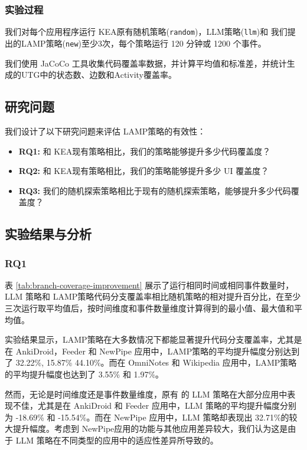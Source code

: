 \documentclass[twocolumn, 10pt]{article}
\newcommand{\kea}{K{\small\MakeUppercase{ea}}}
\newcommand{\lamp}{L{\small\MakeUppercase{amp}}}
\begin{document}
\subsubsection{实验过程}

我们对每个应用程序运行 \kea 原有随机策略(\texttt{random})，LLM策略(\texttt{llm})和 我们提出的\lamp 策略(\texttt{new})至少3次，每个策略运行 120 分钟或 1200 个事件。

我们使用 JaCoCo 工具收集代码覆盖率数据，并计算平均值和标准差，并统计生成的UTG中的状态数、边数和Activity覆盖率。

\subsection{研究问题}

我们设计了以下研究问题来评估 \lamp 策略的有效性：

\begin{itemize}[noitemsep]
    \item \textbf{RQ1:} 和 \kea 现有策略相比，我们的策略能够提升多少代码覆盖度？
    \item \textbf{RQ2:} 和 \kea 现有策略相比，我们的策略能够提升多少 UI 覆盖度？
    \item \textbf{RQ3:} 我们的随机探索策略相比于现有的随机探索策略，能够提升多少代码覆盖度？
\end{itemize}  

\subsection{实验结果与分析}

\subsubsection{RQ1}

表 \ref{tab:branch-coverage-improvement} 展示了运行相同时间或相同事件数量时，LLM 策略和 \lamp 策略代码分支覆盖率相比随机策略的相对提升百分比，在至少三次运行取平均值后，按时间维度和事件数量维度计算得到的最小值、最大值和平均值。

实验结果显示，\lamp 策略在大多数情况下都能显著提升代码分支覆盖率，尤其是在 AnkiDroid，Feeder 和 NewPipe 应用中，\lamp 策略的平均提升幅度分别达到了 32.22\%, 15.87\% 44.10\%。而在 OmniNotes 和 Wikipedia 应用中，\lamp 策略的平均提升幅度也达到了 3.55\% 和 1.97\%。

然而，无论是时间维度还是事件数量维度，原有 的 LLM 策略在大部分应用中表现不佳，尤其是在 AnkiDroid 和 Feeder 应用中，LLM 策略的平均提升幅度分别为 -18.69\% 和 -15.54\%。而在 NewPipe 应用中，LLM 策略却表现出 32.71\%的较大提升幅度。考虑到 NewPipe应用的功能与其他应用差异较大，我们认为这是由于 LLM 策略在不同类型的应用中的适应性差异所导致的。
\end{document}
